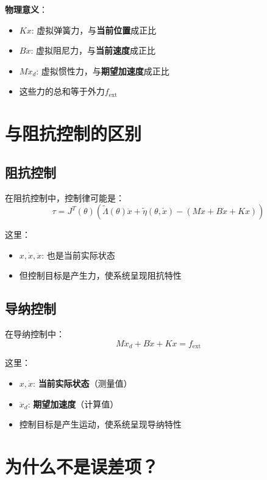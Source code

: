\documentclass[12pt,a4paper]{article}
\begin{document}
\textbf{物理意义}：
\begin{itemize}
\item $Kx$: 虚拟弹簧力，与\textbf{当前位置}成正比
\item $B\dot{x}$: 虚拟阻尼力，与\textbf{当前速度}成正比
\item $M\ddot{x}_d$: 虚拟惯性力，与\textbf{期望加速度}成正比
\item 这些力的总和等于外力$f_{\text{ext}}$
\end{itemize}

\section{与阻抗控制的区别}

\subsection{阻抗控制}

在阻抗控制中，控制律可能是：
\begin{equation}
\tau = J^T(\theta)\left(\tilde{\Lambda}(\theta)\ddot{x} + \tilde{\eta}(\theta, \dot{x}) - (M\ddot{x} + B\dot{x} + Kx)\right)
\end{equation}

这里：
\begin{itemize}
\item $x, \dot{x}, \ddot{x}$: 也是当前实际状态
\item 但控制目标是产生力，使系统呈现阻抗特性
\end{itemize}

\subsection{导纳控制}

在导纳控制中：
\begin{equation}
M\ddot{x}_d + B\dot{x} + Kx = f_{\text{ext}}
\end{equation}

这里：
\begin{itemize}
\item $x, \dot{x}$: \textbf{当前实际状态}（测量值）
\item $\ddot{x}_d$: \textbf{期望加速度}（计算值）
\item 控制目标是产生运动，使系统呈现导纳特性
\end{itemize}

\section{为什么不是误差项？}
\end{document}
